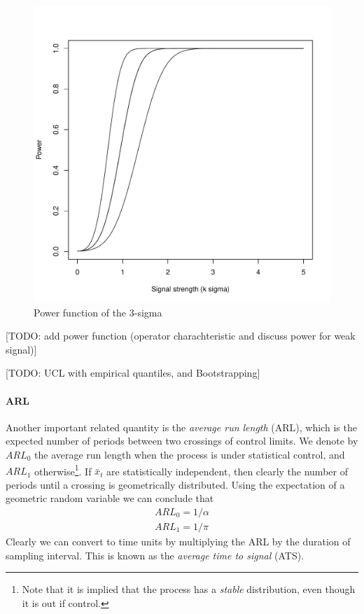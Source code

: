 \begin{figure}[h]
\centering
\includegraphics[height=0.3\textheight]{art/power_function}
\caption[Power Function]{Power function of the 3-sigma \barxChart}
\label{fig:power_function}
\end{figure}





[TODO: add power function (operator charachteristic and discuss power for weak signal)]

[TODO: UCL with empirical quantiles, and Bootstrapping]

\paragraph{ARL}
Another important related quantity is the \emph{average run length} (ARL), which is the expected number of periods between two crossings of control limits. 
We denote by $ARL_0$ the average run length when the process is under statistical control, and $ARL_1$ otherwise\footnote{Note that it is implied that the process has a \emph{stable} distribution, even though it is out if control.}. 
If $\bar{x}_t$ are statistically independent, then clearly the number of periods until a crossing is geometrically distributed. Using the expectation of a geometric random variable we can conclude that 
\begin{align}
	ARL_0=1/\alpha \\
	ARL_1=1/\pi
\end{align}
Clearly we can convert to time units by multiplying the ARL by the duration of sampling interval.
This is known as the \emph{average time to signal} (ATS).


